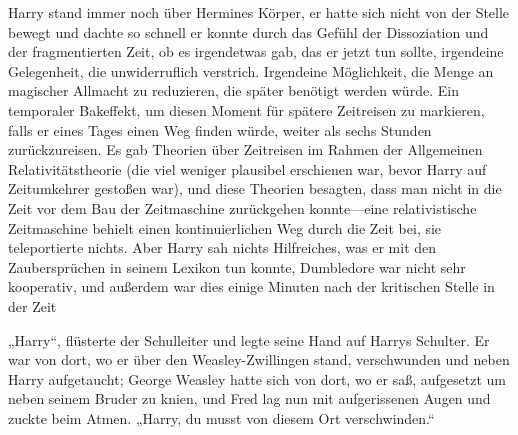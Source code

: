 Harry stand immer noch über Hermines Körper, er hatte sich nicht von der Stelle bewegt und dachte so schnell er konnte durch das Gefühl der Dissoziation und der fragmentierten Zeit, ob es irgendetwas gab, das er jetzt tun sollte, irgendeine Gelegenheit, die unwiderruflich verstrich. Irgendeine Möglichkeit, die Menge an magischer Allmacht zu reduzieren, die später benötigt werden würde. Ein temporaler Bakeffekt, um diesen Moment für spätere Zeitreisen zu markieren, falls er eines Tages einen Weg finden würde, weiter als sechs Stunden zurückzureisen. Es gab Theorien über Zeitreisen im Rahmen der Allgemeinen Relativitätstheorie (die viel weniger plausibel erschienen war, bevor Harry auf Zeitumkehrer gestoßen war), und diese Theorien besagten, dass man nicht in die Zeit vor dem Bau der Zeitmaschine zurückgehen konnte—eine relativistische Zeitmaschine behielt einen kontinuierlichen Weg durch die Zeit bei, sie teleportierte nichts. Aber Harry sah nichts Hilfreiches, was er mit den Zaubersprüchen in seinem Lexikon tun konnte, Dumbledore war nicht sehr kooperativ, und außerdem war dies einige Minuten nach der kritischen Stelle in der Zeit

„Harry“, flüsterte der Schulleiter und legte seine Hand auf Harrys Schulter. Er war von dort, wo er über den Weasley-Zwillingen stand, verschwunden und neben Harry aufgetaucht; George Weasley hatte sich von dort, wo er saß, aufgesetzt um neben seinem Bruder zu knien, und Fred lag nun mit aufgerissenen Augen und zuckte beim Atmen. „Harry, du musst von diesem Ort verschwinden.“

